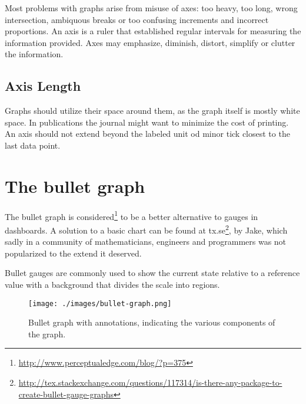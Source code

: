 Most problems with graphs arise from misuse of axes: too heavy, too long, wrong intersection,
ambiquous breaks or too confusing increments and incorrect proportions. An axis is a ruler that established
regular intervals for measuring the information provided. Axes may emphasize, diminish, distort, simplify
or clutter the information.

\clearpage
\begin{multicols}{2}
\subsection{Axis Length}

Graphs should utilize their space around them, as the graph itself is mostly white space. In publications the journal might want to minimize the cost of printing. An axis should not extend beyond the labeled unit od minor tick closest to the last data point.
\columnbreak
{}
\end{multicols}


\section{The bullet graph}

The bullet graph is considered\footnote{\protect\url{http://www.perceptualedge.com/blog/?p=375}} to be a  better alternative to gauges in dashboards. A solution to a basic chart can be found at tx.se\footnote{\url{http://tex.stackexchange.com/questions/117314/is-there-any-package-to-create-bullet-gauge-graphs}}, by Jake, which sadly in a community of mathematicians, engineers and programmers was not popularized to the extend it deserved. 

Bullet gauges are commonly used to show the current state relative to a reference value with a background that divides the scale into regions.

\begin{figure}[htbp]
\centering

\texttt{[image: ./images/bullet-graph.png]}
\caption{Bullet graph with annotations, indicating the various components of the graph.}
\end{figure}



